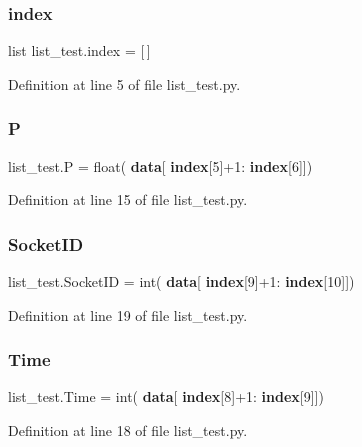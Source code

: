 \mbox{\label{namespacelist__test_abd1f856f57dcbe2ac94b4d3f0374fd0c}} 
\subsubsection{index}
{\footnotesize\ttfamily list list\+\_\+test.\+index = [$\,$]}



Definition at line 5 of file list\+\_\+test.\+py.

\mbox{\label{namespacelist__test_a6795405129cf8b592c600fc68d5d0b5f}} 
\subsubsection{P}
{\footnotesize\ttfamily list\+\_\+test.\+P = float(\textbf{ data}[\textbf{ index}[5]+1\+:\textbf{ index}[6]])}



Definition at line 15 of file list\+\_\+test.\+py.

\mbox{\label{namespacelist__test_a9f5034fb29277ae8c07fe9908ea52673}} 
\subsubsection{Socket\+ID}
{\footnotesize\ttfamily list\+\_\+test.\+Socket\+ID = int(\textbf{ data}[\textbf{ index}[9]+1\+:\textbf{ index}[10]])}



Definition at line 19 of file list\+\_\+test.\+py.

\mbox{\label{namespacelist__test_acc2a7f69c257c8d326aa442a0fc9c8f3}} 
\subsubsection{Time}
{\footnotesize\ttfamily list\+\_\+test.\+Time = int(\textbf{ data}[\textbf{ index}[8]+1\+:\textbf{ index}[9]])}



Definition at line 18 of file list\+\_\+test.\+py.

\mbox{\label{namespacelist__test_a6ef769934097860ffc592c49b8c557ab}} 
